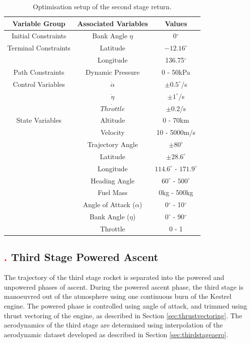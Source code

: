 \begin{table}[ht]
	\centering
\begin{tabular}{|c|c|c|}
	\hline \textbf{Variable Group}  & \textbf{Associated Variables} & \textbf{Values}\\
	\hline Initial Constraints  & Bank Angle $\eta$& 0$^\circ$ \\ 
	\hline Terminal Constraints& Latitude & $-12.16^\circ$ \\& Longitude & 136.75$^\circ$\\
	\hline Path Constraints & Dynamic Pressure& 0 - 50kPa\\ 
				\hline Control Variables & $\dot{\alpha}$ &  $\pm0.5^\circ$/s\\  & $\dot{\eta}$ &  $\pm1^\circ$/s\\ & $\dot{Throttle}$& $\pm0.2$/s\\
				\hline State Variables& Altitude & 0 - 70km\\ & Velocity& 10 - 5000m/s\\ & Trajectory Angle& $\pm80^\circ$\\    & Latitude&$\pm28.6^\circ$ \\  & Longitude& $114.6^\circ$ - $171.9^\circ$\\   & Heading Angle& $60^\circ$ - $500^\circ$ \\  & Fuel Mass& 0kg - 500kg\\  & Angle of Attack ($\alpha$)&  0$^\circ$ - 10$^\circ$\\  & Bank Angle ($\eta$)& $0^\circ$ - 90$^\circ$\\  & Throttle & 0 - 1 \\ 
	\hline 
\end{tabular} 
\caption{Optimisation setup of the second stage return.}

\end{table}

\subsection{\textcolor{red}{.} Third Stage Powered Ascent}
The trajectory of the third stage rocket is separated into the powered and unpowered phases of ascent.
During the powered ascent phase, the third stage is manoeuvred out of the atmosphere using one continuous burn of the Kestrel engine. 
 The powered phase is controlled using angle of attack, and trimmed using thrust vectoring of the engine, as described in Section \ref{sec:thrustvectoring}. The aerodynamics of the third stage are determined using interpolation of the aerodynamic dataset developed as described in Section \ref{sec:thirdstageaero}.

